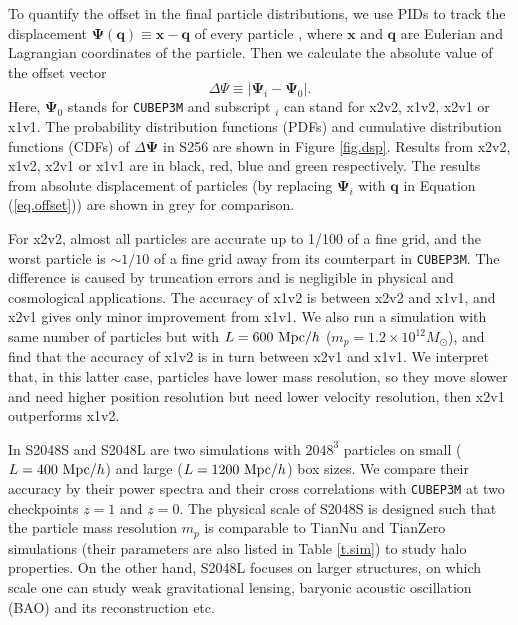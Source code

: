 \documentclass[10pt,twocolumn,preprint]{emulateapj}
\newcommand{\bs}{\boldsymbol}
\newcommand{\Msun}{M_\odot}
\begin{document}
To quantify the offset in the final particle distributions, we use PIDs to track the displacement ${\bs \Psi}({\bs q})\equiv{\bs x}-{\bs q}$ of every particle \citep{2017PhRvD..95d3501Y}, where ${\bs x}$ and ${\bs q}$ are Eulerian and Lagrangian coordinates of the particle. Then we calculate the absolute value of the offset vector
\begin{equation}\label{eq.offset}
	\Delta\Psi\equiv|{\bs\Psi}_i-{\bs\Psi}_0|.
\end{equation}
Here, ${\bs\Psi}_0$ stands for {\tt CUBEP3M} and subscript $_i$ can stand for x2v2, x1v2, x2v1 or x1v1. The probability distribution functions (PDFs) and cumulative distribution functions (CDFs) of $\Delta\bs\Psi$ in S256 are shown in Figure \ref{fig.dsp}. Results from x2v2, x1v2, x2v1 or x1v1 are in black, red, blue and green respectively. The results from absolute displacement of particles (by replacing ${\bs\Psi}_i$ with ${\bs q}$ in Equation (\ref{eq.offset})) are shown in grey for comparison.

For x2v2, almost all particles are accurate up to 1/100 of a fine grid, and the worst particle is $\sim 1/10$ of a fine grid away from its counterpart in {\tt CUBEP3M}. The difference is caused by truncation errors and is negligible in physical and cosmological applications. The accuracy of x1v2 is between x2v2 and x1v1, and x2v1 gives only minor improvement from x1v1. We also run a simulation with same number of particles but with $L=600\ {\rm Mpc}/h$ ($m_p=1.2\times 10^{12}\Msun$), and find that the accuracy of x1v2 is in turn between x2v1 and x1v1. We interpret that, in this latter case, particles have lower mass resolution, so they move slower and need higher position resolution but need lower velocity resolution, then x2v1 outperforms x1v2.

In S2048S and S2048L are two simulations with $2048^3$ particles on small ($L=400\ {\rm Mpc}/h$) and large ($L=1200\ {\rm Mpc}/h$) box sizes. We compare their accuracy by their power spectra and their cross correlations with {\tt CUBEP3M} at two checkpoints $z=1$ and $z=0$. The physical scale of S2048S is designed such that the particle mass resolution $m_p$ is comparable to TianNu and TianZero simulations (their parameters are also listed in Table \ref{t.sim}) to study halo properties. On the other hand, S2048L focuses on larger structures, on which scale one can study weak gravitational lensing, baryonic acoustic oscillation (BAO) \citep{2005ApJ...633..560E} and its reconstruction \citep{2007ApJ...664..675E,2017ApJ...841L..29W} etc.
\end{document}
